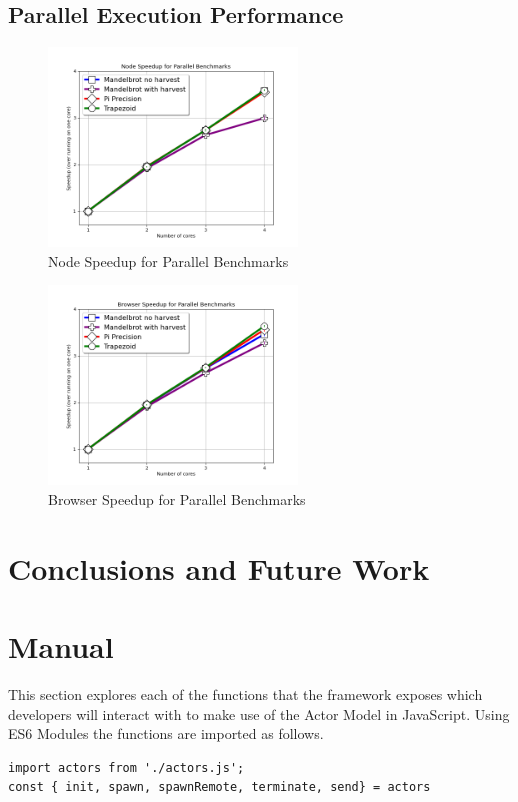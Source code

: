 \documentclass[12pt, a4paper]{report}
\theoremstyle{definition}
\theoremstyle{definition}%
\theoremstyle{definition}%
\theoremstyle{definition}%
\theoremstyle{definition}%
\theoremstyle{definition}%
\begin{document}
\section{Parallel Execution Performance}
\begin{figure}[H]
    \begin{centering}
        \includegraphics[width=250px]{../../benchmarks/visualisations/node_speedup.png}
        \caption{Node Speedup for Parallel Benchmarks}
    \end{centering}
\end{figure}
\begin{figure}[H]
    \begin{centering}
        \includegraphics[width=250px]{../../benchmarks/visualisations/browser_speedup.png}
        \caption{Browser Speedup for Parallel Benchmarks}
    \end{centering}
\end{figure}
\chapter{Conclusions and Future Work}

\appendix

\chapter{Manual}
This section explores each of the functions that the framework exposes which developers will interact with to make use of the Actor Model in JavaScript. Using ES6 Modules the functions are imported as follows.
\begin{lstlisting}
import actors from './actors.js';
const { init, spawn, spawnRemote, terminate, send} = actors
\end{lstlisting}
\end{document}

